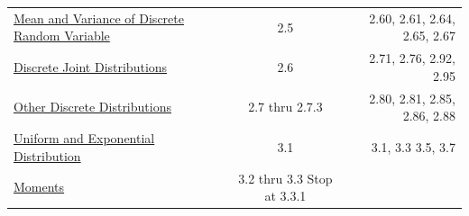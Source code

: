 \documentclass[]{book}
\theoremstyle{definition}
\theoremstyle{definition}
\theoremstyle{definition}
\theoremstyle{remark}
\begin{document}
\begin{longtable}[]{@{}lcr@{}}
\begin{minipage}[t]{0.29\columnwidth}
\protect\hyperlink{L9}{Mean and Variance of Discrete Random
Variable}\strut
\end{minipage} & \begin{minipage}[t]{0.33\columnwidth}\centering\strut
2.5\strut
\end{minipage} & \begin{minipage}[t]{0.29\columnwidth}\raggedleft\strut
2.60, 2.61, 2.64, 2.65, 2.67\strut
\end{minipage}\tabularnewline
\begin{minipage}[t]{0.29\columnwidth}\raggedright\strut
\protect\hyperlink{L10}{Discrete Joint Distributions}\strut
\end{minipage} & \begin{minipage}[t]{0.33\columnwidth}\centering\strut
2.6\strut
\end{minipage} & \begin{minipage}[t]{0.29\columnwidth}\raggedleft\strut
2.71, 2.76, 2.92, 2.95\strut
\end{minipage}\tabularnewline
\begin{minipage}[t]{0.29\columnwidth}\raggedright\strut
\protect\hyperlink{L11}{Other Discrete Distributions}\strut
\end{minipage} & \begin{minipage}[t]{0.33\columnwidth}\centering\strut
2.7 thru 2.7.3\strut
\end{minipage} & \begin{minipage}[t]{0.29\columnwidth}\raggedleft\strut
2.80, 2.81, 2.85, 2.86, 2.88\strut
\end{minipage}\tabularnewline
\begin{minipage}[t]{0.29\columnwidth}\raggedright\strut
\protect\hyperlink{L12}{Uniform and Exponential Distribution}\strut
\end{minipage} & \begin{minipage}[t]{0.33\columnwidth}\centering\strut
3.1\strut
\end{minipage} & \begin{minipage}[t]{0.29\columnwidth}\raggedleft\strut
3.1, 3.3 3.5, 3.7\strut
\end{minipage}\tabularnewline
\begin{minipage}[t]{0.29\columnwidth}\raggedright\strut
\protect\hyperlink{L13}{Moments}\strut
\end{minipage} & \begin{minipage}[t]{0.33\columnwidth}\centering\strut
3.2 thru 3.3 Stop at 3.3.1\strut
\end{minipage} & \begin{minipage}[t]{0.29\columnwidth}\raggedleft\strut

\end{minipage}
\end{longtable}
\end{document}

